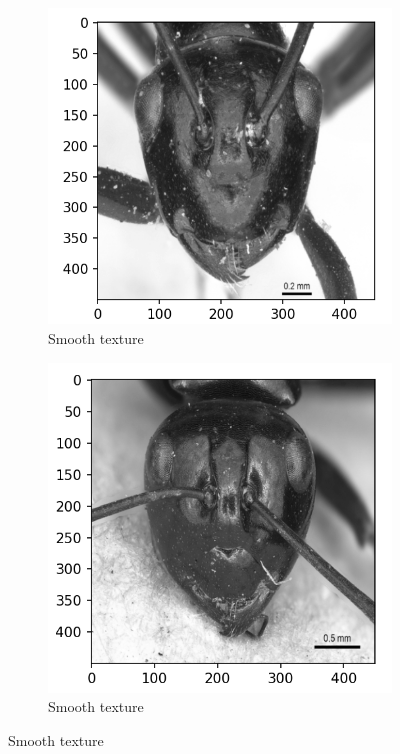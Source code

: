 \documentclass{aci}
\numberwithin{equation}{section}
\begin{document}
\begin{figure}
\begin{subfigure}{\segmentedsubwidth}
    \end{subfigure}
    \begin{subfigure}{\segmentedsubwidth}
        \caption*{Smooth texture}
        \includegraphics[width=1\linewidth]{figs/s105.png}
    \end{subfigure}
    \begin{subfigure}{\segmentedsubwidth}
        \caption*{Smooth texture}
        \includegraphics[width=1\linewidth]{figs/s107.png}
    \end{subfigure}


\end{figure}
\end{document}
